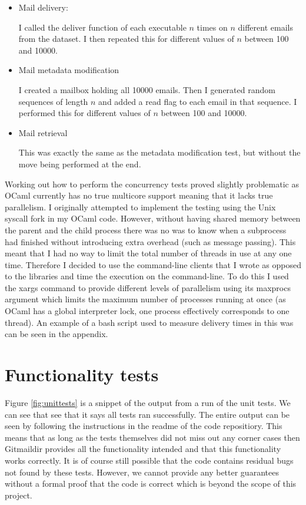 \begin{itemize}
\item Mail delivery:

  I called the deliver function of each executable $n$ times on $n$ different emails from the dataset. I then repeated this for different values of $n$ between 100 and 10000.

\item Mail metadata modification

  I created a mailbox holding all 10000 emails. Then I generated random sequences of length $n$ and added a read flag to each email in that sequence. I performed this for different values of $n$ between 100 and 10000.

\item Mail retrieval

  This was exactly the same as the metadata modification test, but without the move being performed at the end.
\end{itemize}

Working out how to perform the concurrency tests proved slightly problematic as OCaml currently has no true multicore support meaning that it lacks true parallelism. I originally attempted to implement the testing using the Unix syscall fork in my OCaml code. However, without having shared memory between the parent and the child process there was no was to know when a subprocess had finished without introducing extra overhead (such as message passing). This meant that I had no way to limit the total number of threads in use at any one time. Therefore I decided to use the command-line clients that I wrote as opposed to the libraries and time the execution on the command-line. To do this I used the xargs command to provide different levels of parallelism using its maxprocs argument which limits the maximum number of processes running at once (as OCaml has a global interpreter lock, one process effectively corresponds to one thread). An example of a bash script used to measure delivery times in this was can be seen in the appendix.

\section{Functionality tests}

Figure \ref{fig:unittests} is a snippet of the output from a run of the unit tests. We can see that see that it says all tests ran successfully. The entire output can be seen by following the instructions in the readme of the code repositiory. This means that as long as the tests themselves did not miss out any corner cases then Gitmaildir provides all the functionality intended and that this functionality works correctly. It is of course still possible that the code contains residual bugs not found by these tests. However, we cannot provide any better guarantees without a formal proof that the code is correct which is beyond the scope of this project.

